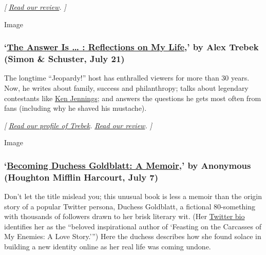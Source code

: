 \emph{{[}}
\href{https://www.nytimes.com/2020/07/24/books/review/lauren-beukes-afterland.html}{\emph{Read
our review}}\emph{. {]}}

Image

\hypertarget{the-answer-is---reflections-on-my-life-by-alex-trebek-simon--schuster-july-21}{%
\subsubsection{\texorpdfstring{`\href{https://www.simonandschuster.com/books/The-Answer-Is/Alex-Trebek/9781982157999}{The
Answer Is \ldots{} : Reflections on My Life},' by Alex Trebek (Simon \&
Schuster, July
21)}{`The Answer Is \ldots{} : Reflections on My Life,' by Alex Trebek (Simon \& Schuster, July 21)}}\label{the-answer-is---reflections-on-my-life-by-alex-trebek-simon--schuster-july-21}}

The longtime ``Jeopardy!'' host has enthralled viewers for more than 30
years. Now, he writes about family, success and philanthropy; talks
about legendary contestants like
\href{https://www.nytimes.com/2020/01/14/arts/television/jeopardy-goat-ken-jennings.html}{Ken
Jennings}; and answers the questions he gets most often from fans
(including why he shaved his mustache).

\emph{{[}}
\href{https://www.nytimes.com/2020/07/17/books/alex-trebek-jeopardy-the-answer-is.html}{\emph{Read
our profile of Trebek}}\emph{. \textbar{}}
\href{https://www.nytimes.com/2020/07/21/books/review-answer-is-alex-trebek-jeopardy-memoir.html}{\emph{Read
our review}}\emph{. {]}}

Image

\hypertarget{becoming-duchess-goldblatt-a-memoir-by-anonymous-houghton-mifflin-harcourt-july-7}{%
\subsubsection{\texorpdfstring{`\href{https://www.hmhbooks.com/shop/books/Becoming-Duchess-Goldblatt/9780358216773}{Becoming
Duchess Goldblatt: A Memoir},' by Anonymous (Houghton Mifflin Harcourt,
July
7)}{`Becoming Duchess Goldblatt: A Memoir,' by Anonymous (Houghton Mifflin Harcourt, July 7)}}\label{becoming-duchess-goldblatt-a-memoir-by-anonymous-houghton-mifflin-harcourt-july-7}}

Don't let the title mislead you; this unusual book is less a memoir than
the origin story of a popular Twitter persona, Duchess Goldblatt, a
fictional 80-something with thousands of followers drawn to her brisk
literary wit. (Her \href{https://twitter.com/duchessgoldblat}{Twitter
bio} identifies her as the ``beloved inspirational author of `Feasting
on the Carcasses of My Enemies: A Love Story.''') Here the duchess
describes how she found solace in building a new identity online as her
real life was coming undone.

